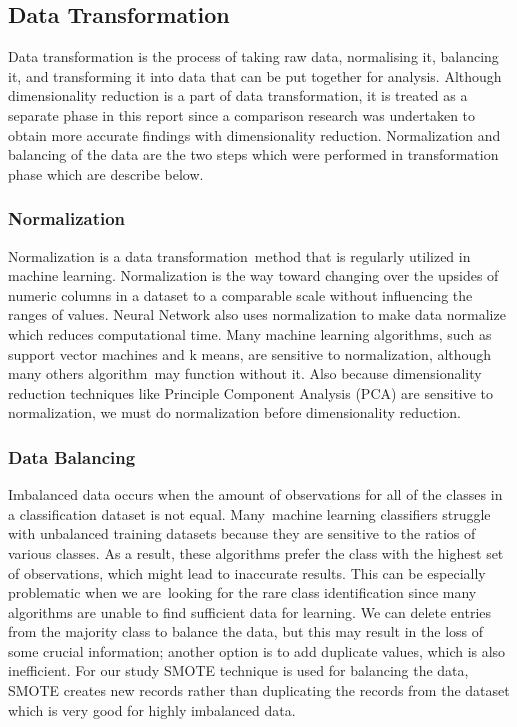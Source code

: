 \documentclass[12pt]{article}
\begin{document}
\subsection{Data Transformation}
Data transformation is the process of taking raw data, normalising it, balancing it, and transforming it into data that can be put together for analysis. Although dimensionality reduction is a part of data transformation, it is treated as a separate phase in this report since a comparison research was undertaken to obtain more accurate findings with dimensionality reduction. Normalization and balancing of the data are the two steps which were performed in transformation phase which are describe below.
\subsubsection{Normalization}
Normalization is a data transformation method that is regularly utilized in machine learning. Normalization is the way toward changing over the upsides of numeric columns in a dataset to a comparable scale without influencing the ranges of values. Neural Network also uses normalization to make data normalize which reduces computational time. Many machine learning algorithms, such as support vector machines and k means, are sensitive to normalization, although many others algorithm may function without it. Also because dimensionality reduction techniques like Principle Component Analysis (PCA) are sensitive to normalization, we must do normalization before dimensionality reduction.

\subsubsection{Data Balancing}
Imbalanced data occurs when the amount of observations for all of the classes in a classification dataset is not equal. Many machine learning classifiers struggle with unbalanced training datasets because they are sensitive to the ratios of various classes. As a result, these algorithms prefer the class with the highest set of observations, which might lead to inaccurate results. This can be especially problematic when we are looking for the rare class identification since many algorithms are unable to find sufficient data for learning. We can delete entries from the majority class to balance the data, but this may result in the loss of some crucial information; another option is to add duplicate values, which is also inefficient. For our study SMOTE technique is used for balancing the data, SMOTE creates new records rather than duplicating the records from the dataset which is very good for highly imbalanced data.
\end{document}
